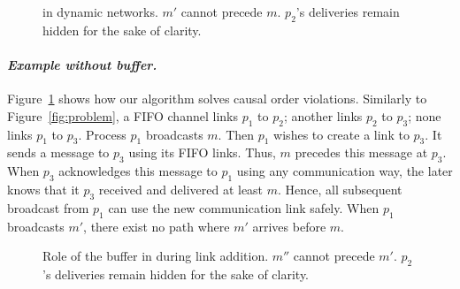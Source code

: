 \begin{figure}
  \begin{center}
    
    \caption{\label{fig:solved}\CBROADCAST in dynamic networks. $m'$ cannot
      precede $m$. $p_2$'s deliveries remain hidden for the sake of clarity.}
  \end{center}
\end{figure}

%     

\paragraph{\emph{Example without buffer.}} Figure~\ref{fig:solved} shows how our
algorithm solves causal order violations. Similarly to Figure~\ref{fig:problem},
a FIFO channel links $p_1$ to $p_2$; another links $p_2$ to $p_3$; none links
$p_1$ to $p_3$. Process $p_1$ broadcasts $m$. Then $p_1$ wishes to create a link
to $p_3$. It sends a message to $p_3$ using its FIFO links. Thus, $m$ precedes
this message at $p_3$. When $p_3$ acknowledges this message to $p_1$ using any
communication way, the later knows that it $p_3$ received and delivered at least
$m$. Hence, all subsequent broadcast from $p_1$ can use the new communication
link safely. When $p_1$ broadcasts $m'$, there exist no path where $m'$ arrives
before $m$.

\begin{figure}
  \begin{center}
    
    \caption{\label{fig:buffer}Role of the buffer in \CBROADCAST during link
      addition. $m''$ cannot precede $m'$. $p_2$'s deliveries remain hidden for
      the sake of clarity.}
  \end{center}
\end{figure}

%     

